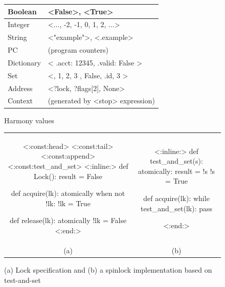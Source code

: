 \documentclass[twocolumn]{article}
\begin{document}
\begin{figure}
\begin{tabular}{|l|l|}
\hline
Boolean & <{False}>, <{True}> \\
\hline
Integer & <{..., -2, -1, 0, 1, 2, ...}> \\
\hline
String & <{"example"}>, <{.example}> \\
\hline
PC & (program counters) \\
\hline
Dictionary & <{{ .acct: 12345, .valid: False }}> \\
\hline
Set & <{{}, { 1, 2, 3 }, { False, .id, 3 }}> \\
\hline
Address & <{?lock, ?flags[2], None}> \\
\hline
Context & (generated by <{stop}> expression) \\
\hline
\end{tabular}
\caption{Harmony values}
\label{fig:values}
\end{figure}

\begin{figure}[h]
\begin{center}
\begin{tabular}{cc}
{\footnotesize
\begin{tcolorbox}[width=0.45\linewidth]
<{:const:head}>
<{:const:tail}>
<{:const:append}>
<{:const:test_and_set}>
<{:inline:}>
def Lock():
    result = False

def acquire(lk):
    atomically when not !lk:
        !lk = True

def release(lk):
    atomically !lk = False
<{:end:}>
\end{tcolorbox}
}
&
{\footnotesize
\begin{tcolorbox}[width=0.45\linewidth]
<{:inline:}>
def test_and_set(s):
    atomically:
        result = !s
        !s = True

def acquire(lk):
    while test_and_set(lk):
        pass

<{:end:}>
\end{tcolorbox}
}
\\
(a) & (b)
\end{tabular}
\end{center}
\caption{(a) Lock specification and (b) a spinlock implementation based on
test-and-set}
\label{fig:synch}
\end{figure}
\end{document}
